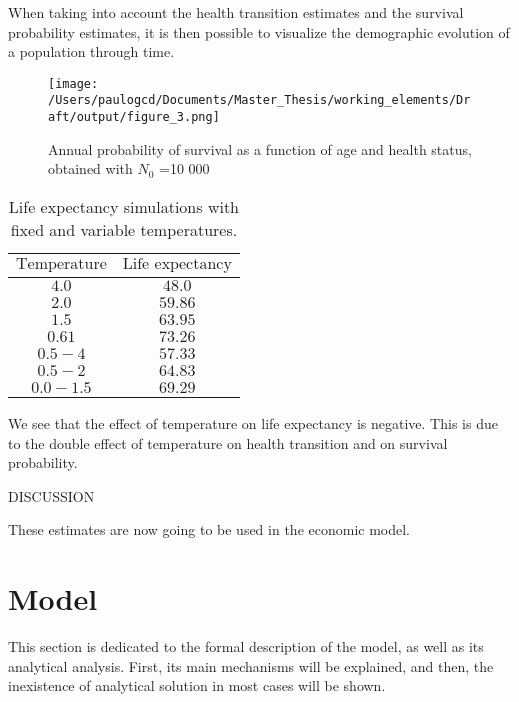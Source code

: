 \documentclass{article}
\begin{document}
When taking into account the health transition estimates
and the survival probability estimates, it is then possible
to visualize the demographic evolution of a population through time.

\begin{figure}[H]
    \texttt{[image: /Users/paulogcd/Documents/Master\_Thesis/working\_elements/Draft/output/figure\_3.png]}
    \caption{Annual probability of survival as a function of age and health status, obtained with $N_0$ =10 000 }
\end{figure}

\begin{table}[H]
    \begin{center}
        \begin{tabular}{cc}
            \toprule
            $\text{Temperature}$ & $\text{Life expectancy}$\\
            \midrule
            $4.0$ & $48.0$\\
            $2.0$ & $59.86$\\
            $1.5$ & $63.95$\\
            $0.61$ & $73.26$\\
            $0.5 - 4$ & $57.33$\\
            $0.5 - 2$ & $64.83$\\
            $0.0 - 1.5$ & $69.29$\\
            \bottomrule
        \end{tabular}
        \caption{Life expectancy simulations with fixed and variable temperatures.}
    \end{center}
\end{table}

We see that the effect of temperature on life expectancy 
is negative. 
This is due to the double effect of temperature on 
health transition and on survival probability.

DISCUSSION

These estimates are now going to be used in 
the economic model.

\section{Model}

This section is dedicated to the formal description of 
the model, as well as its analytical analysis.
First, its main mechanisms will be explained, and then, the 
inexistence of analytical solution in most cases will be shown.
\end{document}
